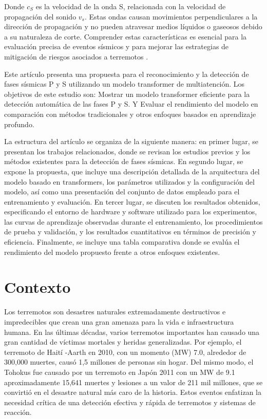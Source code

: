 Donde $c_{S}$ es la velocidad de la onda S, relacionada con la velocidad de propagación del sonido $v_{s}$. Estas ondas causan movimientos perpendiculares a la dirección de propagación y no pueden atravesar medios líquidos o gaseosos debido a su naturaleza de corte. Comprender estas características es esencial para la evaluación precisa de eventos sísmicos y para mejorar las estrategias de mitigación de riesgos asociados a terremotos \cite{chapman2004fundamentals}.

Este artículo presenta una propuesta para el reconocimiento y la detección de fases sísmicas P y S utilizando un modelo transformer de multiatención. Los objetivos de este estudio son: Mostrar un modelo transformer eficiente para la detección automática de las fases P y S. Y Evaluar el rendimiento del modelo en comparación con métodos tradicionales y otros enfoques basados en aprendizaje profundo.

La estructura del artículo se organiza de la siguiente manera: en primer lugar, se presentan los trabajos relacionados, donde se revisan los estudios previos y los métodos existentes para la detección de fases sísmicas. En segundo lugar, se expone la propuesta, que incluye una descripción detallada de la arquitectura del modelo basado en transformers, los parámetros utilizados y la configuración del modelo, así como una presentación del conjunto de datos empleado para el entrenamiento y evaluación. En tercer lugar, se discuten los resultados obtenidos, especificando el entorno de hardware y software utilizado para los experimentos, las curvas de aprendizaje observadas durante el entrenamiento, los procedimientos de prueba y validación, y los resultados cuantitativos en términos de precisión y eficiencia. Finalmente, se incluye una tabla comparativa donde se evalúa el rendimiento del modelo propuesto frente a otros enfoques existentes.

\section{Contexto}

Los terremotos son desastres naturales extremadamente destructivos e impredecibles que crean una gran amenaza para la vida e infraestructura humana. En las últimas décadas, varios terremotos importantes han causado una gran cantidad de víctimas mortales y heridas generalizadas. Por ejemplo, el terremoto de Haití -Aarth en 2010, con un momento (MW) 7.0, alrededor de 300,000 muertes, causó 1,5 millones de personas sin hogar. Del mismo modo, el Tohokus fue causado por un terremoto en Japón 2011 con un MW de 9.1 aproximadamente 15,641 muertes y lesiones a un valor de 211 mil millones, que se convirtió en el desastre natural más caro de la historia. Estos eventos enfatizan la necesidad crítica de una detección efectiva y rápida de terremotos y sistemas de reacción.

